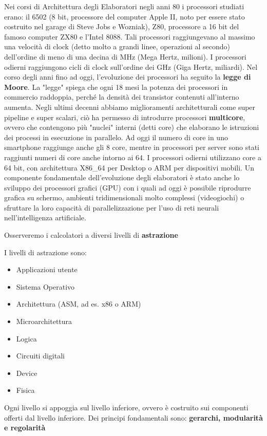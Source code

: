 Nei corsi di Architettura degli Elaboratori negli anni 80 i processori studiati erano: il 6502 (8 bit, processore del computer Apple II, noto per essere stato costruito nel garage di Steve Jobs e Wozniak), Z80, processore a 16 bit del famoso computer ZX80 e l'Intel 8088. Tali processori raggiungevano al massimo una velocità di clock (detto molto a grandi linee, operazioni al secondo) dell'ordine di meno di una decina di MHz (Mega Hertz, milioni). I processori odierni raggiungono
cicli di clock sull'ordine dei GHz (Giga Hertz, miliardi). Nel corso degli anni fino ad oggi, l'evoluzione dei processori ha seguito la \textbf{legge di Moore}. La "legge" spiega che ogni 18 mesi la potenza dei processori in commercio raddoppia, perché la densità dei transistor contenuti all'interno aumenta. Negli ultimi decenni abbiamo  miglioramenti architetturali come super pipeline e super scalari, ciò ha permesso di introdurre processori \textbf{multicore}, ovvero che contengono più "nuclei" interni (detti core) che elaborano le istruzioni dei processi in esecuzione in parallelo.
Ad oggi il numero di core in uno smartphone raggiunge anche gli 8 core, mentre in processori per server sono stati raggiunti numeri di core anche intorno ai 64. I processori odierni utilizzano core a 64 bit, con architettura X86\_64 per Desktop o ARM per dispositivi mobili.
Un componente fondamentale dell'evoluzione degli elaboratori è stato anche lo sviluppo dei processori grafici (GPU) con i quali ad oggi è possibile riprodurre grafica su schermo, ambienti tridimensionali molto complessi (videogiochi) o sfruttare la loro capacità di parallelizzazione per l'uso di reti neurali nell'intelligenza artificiale.

Osserveremo i calcolatori a diversi livelli di \textbf{astrazione}

I livelli di astrazione sono:
\begin{itemize}
	\item Applicazioni utente
	\item Sistema Operativo
	\item Architettura (ASM, ad es. x86 o ARM)
	\item Microarchitettura
	\item Logica
	\item Circuiti digitali
	\item Device
	\item Fisica
\end{itemize}

Ogni livello si appoggia sul livello inferiore, ovvero è costruito sui componenti offerti dal livello inferiore. Dei principi fondamentali sono: \textbf{gerarchi, modularità e regolarità}

